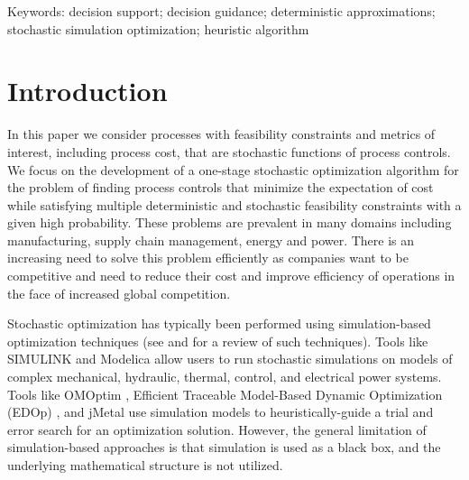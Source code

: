\documentclass[a4paper, 12pt]{article} %
\begin{document}
{\small  Keywords: decision support;
	decision guidance;
	deterministic approximations;
	stochastic simulation optimization;
	heuristic algorithm } %

\vspace{5pt} %

\section{Introduction}


In this paper we consider processes with feasibility constraints and metrics of interest, including  process cost, that are stochastic functions of process controls.
We focus on the development of a one-stage stochastic optimization algorithm for the problem of finding process controls that minimize the expectation of cost while satisfying multiple deterministic and stochastic feasibility constraints with a given high probability. 
These problems are prevalent in many domains including manufacturing, supply chain management, energy and power. 
There is an increasing need to solve this problem efficiently as companies want to be competitive and need to reduce their cost and improve efficiency of operations in the face of increased global competition. 


Stochastic optimization has typically been performed using simulation-based optimization techniques (see \cite{Amaran2016} and \cite{Nguyen2014} for a review of such techniques). 
Tools like SIMULINK \cite{Dabney:2001:MS:557989} and Modelica \cite{elmqvist1998modelica,Provan2012modelica} allow users to run stochastic simulations on models of complex mechanical, hydraulic, thermal, control, and electrical power systems.
Tools like OMOptim \cite{OMOptim}, Efficient Traceable Model-Based Dynamic Optimization (EDOp) \cite{EDOp}, and jMetal \cite{jMetal} use simulation models to heuristically-guide a trial and error search for an optimization solution.
However, the general limitation of simulation-based approaches is that simulation is used as a black box, and the underlying mathematical structure is not utilized. 


\end{document}
